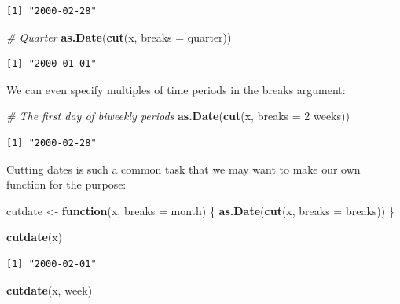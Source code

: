 \documentclass[
]{book}
\newenvironment{Shaded}{\begin{snugshade}}{\end{snugshade}}
\newcommand{\AttributeTok}[1]{\textcolor[rgb]{0.13,0.29,0.53}{#1}}
\newcommand{\CommentTok}[1]{\textcolor[rgb]{0.56,0.35,0.01}{\textit{#1}}}
\newcommand{\ControlFlowTok}[1]{\textcolor[rgb]{0.13,0.29,0.53}{\textbf{#1}}}
\newcommand{\FunctionTok}[1]{\textcolor[rgb]{0.13,0.29,0.53}{\textbf{#1}}}
\newcommand{\NormalTok}[1]{#1}
\newcommand{\OtherTok}[1]{\textcolor[rgb]{0.56,0.35,0.01}{#1}}
\newcommand{\StringTok}[1]{\textcolor[rgb]{0.31,0.60,0.02}{#1}}
\begin{document}
\begin{verbatim}
[1] "2000-02-28"
\end{verbatim}

\begin{Shaded}
\begin{Highlighting}[]
\CommentTok{\# Quarter}
\FunctionTok{as.Date}\NormalTok{(}\FunctionTok{cut}\NormalTok{(x, }\AttributeTok{breaks =} \StringTok{\textquotesingle{}quarter\textquotesingle{}}\NormalTok{))}
\end{Highlighting}
\end{Shaded}

\begin{verbatim}
[1] "2000-01-01"
\end{verbatim}

We can even specify multiples of time periods in the breaks argument:

\begin{Shaded}
\begin{Highlighting}[]
\CommentTok{\# The first day of biweekly periods}
\FunctionTok{as.Date}\NormalTok{(}\FunctionTok{cut}\NormalTok{(x, }\AttributeTok{breaks =} \StringTok{\textquotesingle{}2 weeks\textquotesingle{}}\NormalTok{))}
\end{Highlighting}
\end{Shaded}

\begin{verbatim}
[1] "2000-02-28"
\end{verbatim}

Cutting dates is such a common task that we may want to make our own function for the purpose:

\begin{Shaded}
\begin{Highlighting}[]
\NormalTok{cutdate }\OtherTok{\textless{}{-}} \ControlFlowTok{function}\NormalTok{(x, }\AttributeTok{breaks =} \StringTok{\textquotesingle{}month\textquotesingle{}}\NormalTok{) \{}
  \FunctionTok{as.Date}\NormalTok{(}\FunctionTok{cut}\NormalTok{(x, }\AttributeTok{breaks =}\NormalTok{ breaks))}
\NormalTok{\}}

\FunctionTok{cutdate}\NormalTok{(x)}
\end{Highlighting}
\end{Shaded}

\begin{verbatim}
[1] "2000-02-01"
\end{verbatim}

\begin{Shaded}
\begin{Highlighting}[]
\FunctionTok{cutdate}\NormalTok{(x, }\StringTok{\textquotesingle{}week\textquotesingle{}}\NormalTok{)}
\end{Highlighting}
\end{Shaded}
\end{document}
